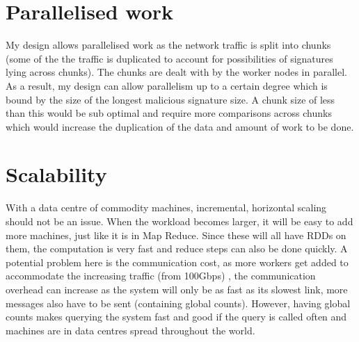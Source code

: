 \documentclass[11pt]{article}
\begin{document}
\section{Parallelised work}
My design allows parallelised work as the network traffic is 
split into chunks (some of the the traffic is duplicated to 
account for possibilities of signatures lying across
chunks). The chunks are dealt with by the worker nodes in parallel. 
As a result, my design can allow parallelism up to a
certain degree which is bound by the size of the longest
malicious signature size. A chunk size of less than this would be sub 
optimal and require more comparisons across chunks which would
increase the duplication of the data and amount of work to be 
done.

\section{Scalability}
With a data centre of commodity machines, incremental, horizontal scaling 
should not be an issue. When the workload becomes larger, it
will be easy to add more machines, just like it is in Map Reduce. Since
these will all have RDDs on them, the computation is very fast and reduce 
steps can also be done quickly. A potential problem here is the
communication cost, as more workers get added to accommodate the
increasing traffic (from 100Gbps) , the communication 
overhead can increase as the system will only be as fast as its slowest 
link, more messages also have to be sent (containing global counts). 
However, having global counts makes querying the system fast and good if
the query is called often and machines are in data centres spread 
throughout the world. 
\end{document}
